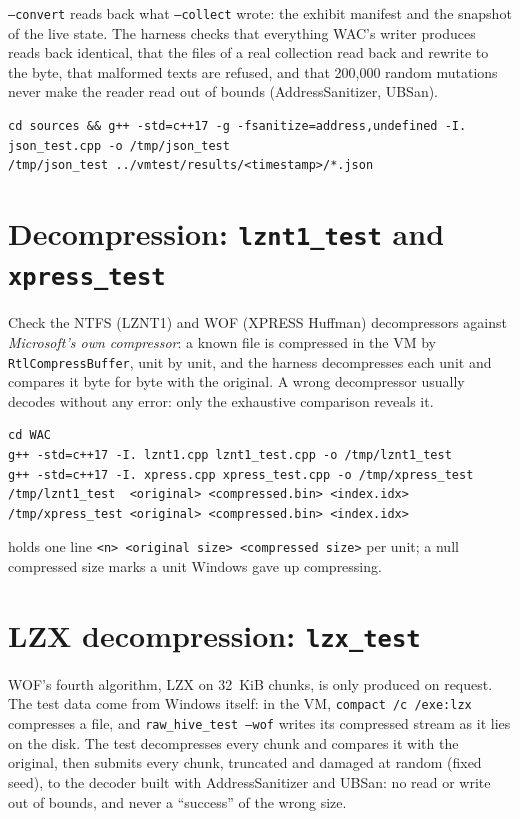 \documentclass[11pt,a4paper,oneside]{report}
\begin{document}
\texttt{--convert} reads back what \texttt{--collect} wrote: the exhibit
manifest and the snapshot of the live state. The harness checks that
everything WAC's writer produces reads back identical, that the files of a real
collection read back and rewrite to the byte, that malformed texts are refused,
and that 200,000 random mutations never make the reader read out of bounds
(AddressSanitizer, UBSan).

\begin{lstlisting}
cd sources && g++ -std=c++17 -g -fsanitize=address,undefined -I. json_test.cpp -o /tmp/json_test
/tmp/json_test ../vmtest/results/<timestamp>/*.json
\end{lstlisting}

\section{Decompression: \texttt{lznt1\_test} and \texttt{xpress\_test}}

Check the NTFS (LZNT1) and WOF (XPRESS Huffman) decompressors against
\emph{Microsoft's own compressor}: a known file is compressed in the VM by
\texttt{RtlCompressBuffer}, unit by unit, and the harness decompresses each unit
and compares it byte for byte with the original. A wrong decompressor usually
decodes without any error: only the exhaustive comparison reveals it.

\begin{lstlisting}
cd WAC
g++ -std=c++17 -I. lznt1.cpp lznt1_test.cpp -o /tmp/lznt1_test
g++ -std=c++17 -I. xpress.cpp xpress_test.cpp -o /tmp/xpress_test
/tmp/lznt1_test  <original> <compressed.bin> <index.idx>
/tmp/xpress_test <original> <compressed.bin> <index.idx>
\end{lstlisting}

 holds one line \texttt{<n> <original size> <compressed
size>} per unit; a null compressed size marks a unit Windows gave up
compressing.

\section{LZX decompression: \texttt{lzx\_test}}

WOF's fourth algorithm, LZX on 32~KiB chunks, is only produced on request. The
test data come from Windows itself: in the VM, \texttt{compact /c /exe:lzx}
compresses a file, and \texttt{raw\_hive\_test --wof} writes its compressed
stream as it lies on the disk. The test decompresses every chunk and compares it
with the original, then submits every chunk, truncated and damaged at random
(fixed seed), to the decoder built with AddressSanitizer and UBSan: no read or
write out of bounds, and never a ``success'' of the wrong size.
\end{document}
